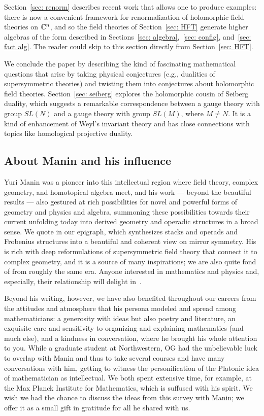 \documentclass[11pt]{amsart}
\begin{document}
Section~\ref{sec: renorm} describes recent work that allows one to produce examples:
there is now a convenient framework for renormalization of holomorphic field theories on $\mathbb C^n$,
and so the field theories of Section~\ref{sec: HFT} generate higher algebras of the form described in Sections~\ref{sec: algebra},~\ref{sec: config}, and~\ref{sec: fact alg}.
The reader could skip to this section directly from Section~\ref{sec: HFT}.

We conclude the paper by describing the kind of fascinating mathematical questions
that arise by taking physical conjectures (e.g., dualities of supersymmetric theories) and twisting them into conjectures about holomorphic field theories. 
Section~\ref{sec: seiberg} explores the holomorphic cousin of Seiberg duality,
which suggests a remarkable correspondence between a gauge theory with group $SL(N)$ and a gauge theory with group $SL(M)$, where $M \neq N$.
It is a kind of enhancement of Weyl's invariant theory and has close connections with topics like homological projective duality.

\subsection{About Manin and his influence}

Yuri Manin was a pioneer into this intellectual region where field theory, complex geometry, and homotopical algebra meet,
and his work --- beyond the beautiful results --- also gestured at rich possibilities for novel and powerful forms of geometry and physics and algebra,
summoning these possibilities towards their current unfolding today into derived geometry and operadic structures in a broad sense.
We quote \cite{ManFrob} in our epigraph, which synthesizes stacks and operads and Frobenius structures into a beautiful and coherent view on mirror symmetry.
His \cite{ManGauge} is rich with deep reformulations of supersymmetric field theory that connect it to complex geometry,
and it is a source of many inspirations;
we are also quite fond of \cite{BeiMan, ManNewDim} from roughly the same era.
Anyone interested in mathematics and physics and, especially, their relationship will delight in~\cite{ManMP}.

Beyond his writing, however, we have also benefited throughout our careers from the attitudes and atmosphere that his persona modeled and spread among mathematicians:
a generosity with ideas but also poetry and literature, an exquisite care and sensitivity to organizing and explaining mathematics (and much else),
and a kindness in conversation, where he brought his whole attention to you.
While a graduate student at Northwestern, 
OG had the unbelievable luck to overlap with Manin and thus to take several courses and have many conversations with him, 
getting to witness the personification of the Platonic idea of mathematician as intellectual.
We both spent extensive time, for example, at the Max Planck Institute for Mathematics,
which is suffused with his spirit.
We wish we had the chance to discuss the ideas from this survey with Manin;
we offer it as a small gift in gratitude for all he shared with us.
\end{document}
